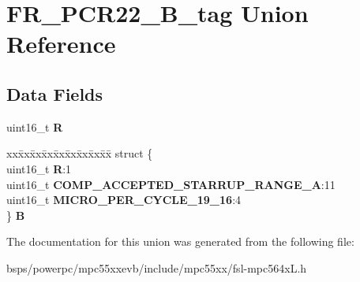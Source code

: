 \hypertarget{unionFR__PCR22__16B__tag}{}\section{F\+R\+\_\+\+P\+C\+R22\+\_\+B\+\_\+tag Union Reference}
\label{unionFR__PCR22__16B__tag}
\subsection*{Data Fields}
\begin{DoxyCompactItemize}
\item 
\mbox{\label{unionFR__PCR22__16B__tag_a2f51fe3faee760673fe751ba2019870b}} 
uint16\+\_\+t {\bfseries R}
\item 
\mbox{\label{unionFR__PCR22__16B__tag_acea2e9071ce673de64e005dd4479f174}} 
\begin{tabbing}
xx\=xx\=xx\=xx\=xx\=xx\=xx\=xx\=xx\=\kill
struct \{\\
\>uint16\_t {\bfseries R}:1\\
\>uint16\_t {\bfseries COMP\_ACCEPTED\_STARRUP\_RANGE\_A}:11\\
\>uint16\_t {\bfseries MICRO\_PER\_CYCLE\_19\_16}:4\\
\} {\bfseries B}\\

\end{tabbing}\end{DoxyCompactItemize}


The documentation for this union was generated from the following file\+:\begin{DoxyCompactItemize}
\item 
bsps/powerpc/mpc55xxevb/include/mpc55xx/fsl-\/mpc564x\+L.\+h\end{DoxyCompactItemize}
